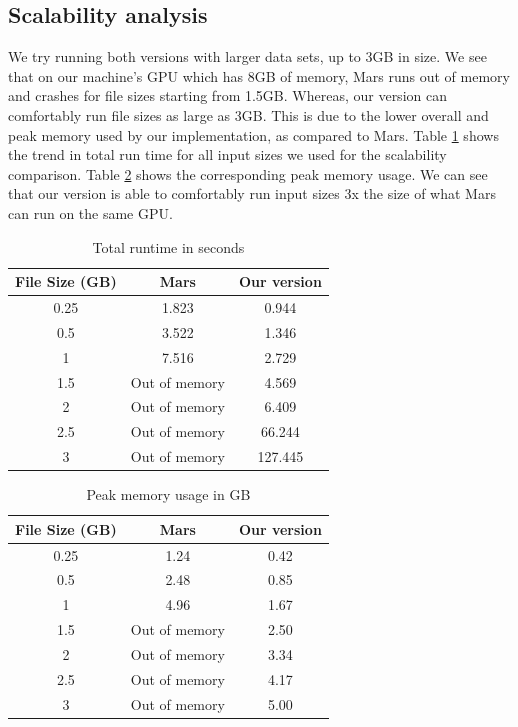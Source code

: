 \documentclass{article}
\begin{document}
\subsection{Scalability analysis}
We try running both versions with larger data sets, up to 3GB in size. We see that on our machine's GPU which has 8GB of memory, Mars runs out of memory and crashes for file sizes starting from 1.5GB. Whereas, our version can comfortably run file sizes as large as 3GB. This is due to the lower overall and peak memory used by our implementation, as compared to Mars. Table \ref{table:total-runtime} shows the trend in total run time for all input sizes we used for the scalability comparison. Table \ref{table:peak-memory-use} shows the corresponding peak memory usage. We can see that our version is able to comfortably run input sizes 3x the size of what Mars can run on the same GPU.   

\begin{table}[h!]
\centering
\begin{tabular}{|c|c|c|} 
 \hline
 File Size (GB) & Mars & Our version\\  
 \hline
 0.25 &  1.823 & 0.944  \\ 
 0.5 & 3.522 & 1.346  \\
 1 & 7.516 & 2.729  \\
 1.5 & Out of memory & 4.569 \\
 2 & Out of memory & 6.409 \\
 2.5 & Out of memory & 66.244 \\
 3 & Out of memory & 127.445 \\ 
\hline
\end{tabular}
\caption{Total runtime in seconds}
\label{table:total-runtime}
\end{table}

\begin{table}[h!]
\centering
\begin{tabular}{|c|c|c|} 
 \hline
 File Size (GB) & Mars & Our version\\  
 \hline
 0.25 &  1.24 & 0.42  \\ 
 0.5 & 2.48 & 0.85  \\
 1 & 4.96 & 1.67  \\
 1.5 & Out of memory & 2.50 \\
 2 & Out of memory & 3.34 \\
 2.5 & Out of memory & 4.17 \\
 3 & Out of memory & 5.00 \\ 
\hline
\end{tabular}
\caption{Peak memory usage in GB}
\label{table:peak-memory-use}
\end{table}
\end{document}
